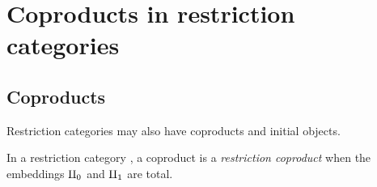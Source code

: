 \section{Coproducts in restriction categories} %
\label{sec:coproducts_in_restriction_categories}
\subsection{Coproducts} %
\label{sub:coproducts}

Restriction categories may also have coproducts and initial objects.
\begin{definition}
  In a restriction category \X, a coproduct is a \emph{restriction coproduct} when the embeddings
  $\amalg_{0}$ and $\amalg_{1}$ are total.
\end{definition}

